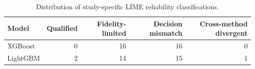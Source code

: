 \begin{table}
\caption{Distribution of study-specific LIME reliability classifications.}
\label{tab:lime_reliability_distribution}
\begin{tabular}{lrrrr}
\toprule
Model & Qualified & Fidelity-limited & Decision mismatch & Cross-method divergent \\
\midrule
XGBoost & 0 & 16 & 16 & 0 \\
LightGBM & 2 & 14 & 15 & 1 \\
\bottomrule
\end{tabular}
\end{table}
